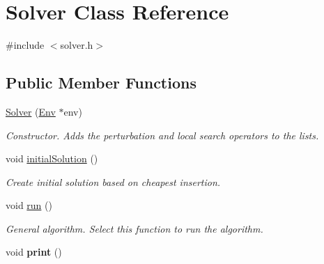 \hypertarget{class_solver}{}\section{Solver Class Reference}
\label{class_solver}


{\ttfamily \#include $<$solver.\+h$>$}

\subsection*{Public Member Functions}
\begin{DoxyCompactItemize}
\item 
\hyperlink{class_solver_a05ec0ef6028f51c1eba417b41a14c2ea}{Solver} (\hyperlink{class_env}{Env} $\ast$env)
\begin{DoxyCompactList}\small\item\em Constructor. Adds the perturbation and local search operators to the lists. \end{DoxyCompactList}\item 
\mbox{\label{class_solver_a4b0fc2950022b5e5166b6d3f0564696f}} 
void \hyperlink{class_solver_a4b0fc2950022b5e5166b6d3f0564696f}{initial\+Solution} ()
\begin{DoxyCompactList}\small\item\em Create initial solution based on cheapest insertion. \end{DoxyCompactList}\item 
\mbox{\label{class_solver_a1f31e2d38dacd7e828c1bf428eb2ed96}} 
void \hyperlink{class_solver_a1f31e2d38dacd7e828c1bf428eb2ed96}{run} ()
\begin{DoxyCompactList}\small\item\em General algorithm. Select this function to run the algorithm. \end{DoxyCompactList}\item 
\mbox{\label{class_solver_a39ebda60ffaadddc1c4f85bd6cf9209c}} 
void {\bfseries print} ()
\end{DoxyCompactItemize}
